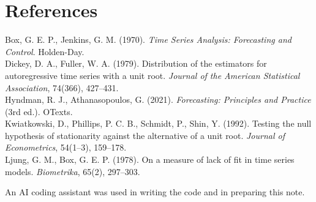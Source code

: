 \documentclass[11pt,a4paper]{article}
\begin{document}
\section*{References}
{\small
Box, G. E. P., Jenkins, G. M. (1970). \textit{Time Series Analysis: Forecasting and Control}. Holden-Day.\\
Dickey, D. A., Fuller, W. A. (1979). Distribution of the estimators for autoregressive time series with a unit root.
\textit{Journal of the American Statistical Association}, 74(366), 427--431.\\
Hyndman, R. J., Athanasopoulos, G. (2021). \textit{Forecasting: Principles and Practice} (3rd ed.). OTexts.\\
Kwiatkowski, D., Phillips, P. C. B., Schmidt, P., Shin, Y. (1992). Testing the null hypothesis of stationarity
against the alternative of a unit root. \textit{Journal of Econometrics}, 54(1--3), 159--178.\\
Ljung, G. M., Box, G. E. P. (1978). On a measure of lack of fit in time series models. \textit{Biometrika}, 65(2),
297--303.

\smallskip
An AI coding assistant was used in writing the code and in preparing this note.
}
\end{document}
